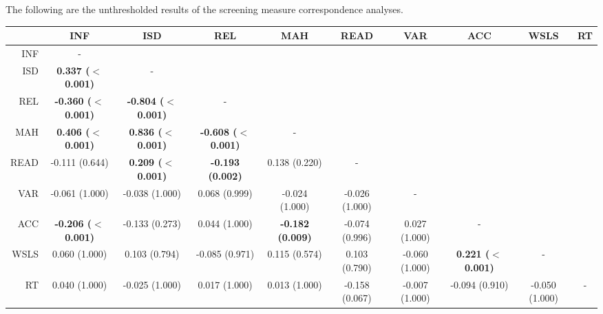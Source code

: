 \documentclass[a4paper,notitlepage,12pt]{article}
\begin{document}
The following are the unthresholded results of the screening measure correspondence analyses.

\begin{table}[H]
    \centering
    \begin{adjustbox}{center}
    \tiny
    \begin{tabular}{rccccccccc}
        \toprule
        {} &      INF &      ISD &      REL &      MAH &    READ &     VAR &     ACC &   WSLS & RT \\
        \midrule
        INF  &                           - &                             &                             &                          &                 &                 &                            &                 &    \\
    ISD  &   \textbf{0.337 ($<$0.001)} &                           - &                             &                          &                 &                 &                            &                 &    \\
    REL  &  \textbf{-0.360 ($<$0.001)} &  \textbf{-0.804 ($<$0.001)} &                           - &                          &                 &                 &                            &                 &    \\
    MAH  &   \textbf{0.406 ($<$0.001)} &   \textbf{0.836 ($<$0.001)} &  \textbf{-0.608 ($<$0.001)} &                        - &                 &                 &                            &                 &    \\
    READ &              -0.111 (0.644) &   \textbf{0.209 ($<$0.001)} &     \textbf{-0.193 (0.002)} &            0.138 (0.220) &               - &                 &                            &                 &    \\
    VAR  &              -0.061 (1.000) &              -0.038 (1.000) &               0.068 (0.999) &           -0.024 (1.000) &  -0.026 (1.000) &               - &                            &                 &    \\
    ACC  &  \textbf{-0.206 ($<$0.001)} &              -0.133 (0.273) &               0.044 (1.000) &  \textbf{-0.182 (0.009)} &  -0.074 (0.996) &   0.027 (1.000) &                          - &                 &    \\
    WSLS &               0.060 (1.000) &               0.103 (0.794) &              -0.085 (0.971) &            0.115 (0.574) &   0.103 (0.790) &  -0.060 (1.000) &  \textbf{0.221 ($<$0.001)} &               - &    \\
    RT   &               0.040 (1.000) &              -0.025 (1.000) &               0.017 (1.000) &            0.013 (1.000) &  -0.158 (0.067) &  -0.007 (1.000) &             -0.094 (0.910) &  -0.050 (1.000) &  - \\

\end{tabular}
\end{adjustbox}
\end{table}
\end{document}

